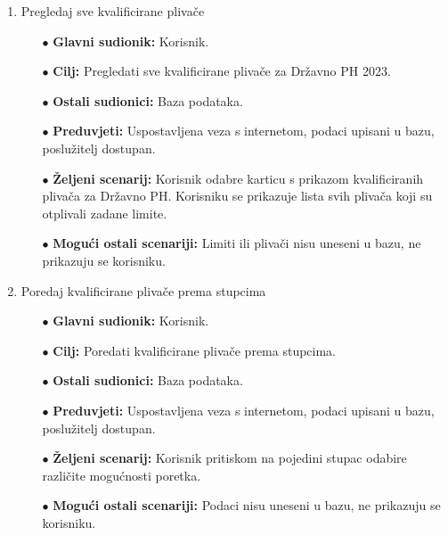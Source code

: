 \documentclass[times, utf8, zavrsni]{fer}
\begin{document}
\begin{enumerate}
    \item Pregledaj sve kvalificirane plivače
    \begin{itemize}
        \item[$\bullet$] \textbf{Glavni sudionik:} Korisnik.
        \item[$\bullet$] \textbf{Cilj:} Pregledati sve kvalificirane plivače za Državno PH 2023.
        \item[$\bullet$] \textbf{Ostali sudionici:} Baza podataka.
        \item[$\bullet$] \textbf{Preduvjeti:} Uspostavljena veza s internetom, podaci upisani u bazu, poslužitelj dostupan.
        \item[$\bullet$] \textbf{Željeni scenarij:} Korisnik odabre karticu s prikazom kvalificiranih plivača za Državno PH. Korisniku se prikazuje
        lista svih plivača koji su otplivali zadane limite.
        \item[$\bullet$] \textbf{Mogući ostali scenariji:} Limiti ili plivači nisu uneseni u bazu, ne prikazuju se korisniku.
    \end{itemize}


    \item Poredaj kvalificirane plivače prema stupcima
    \begin{itemize}
        \item[$\bullet$] \textbf{Glavni sudionik:} Korisnik.
        \item[$\bullet$] \textbf{Cilj:} Poredati kvalificirane plivače prema stupcima.
        \item[$\bullet$] \textbf{Ostali sudionici:} Baza podataka.
        \item[$\bullet$] \textbf{Preduvjeti:} Uspostavljena veza s internetom, podaci upisani u bazu, poslužitelj dostupan.
        \item[$\bullet$] \textbf{Željeni scenarij:} Korisnik pritiskom na pojedini stupac odabire različite mogućnosti poretka.
        \item[$\bullet$] \textbf{Mogući ostali scenariji:} Podaci nisu uneseni u bazu, ne prikazuju se korisniku.
    \end{itemize}



\end{enumerate}
\end{document}
